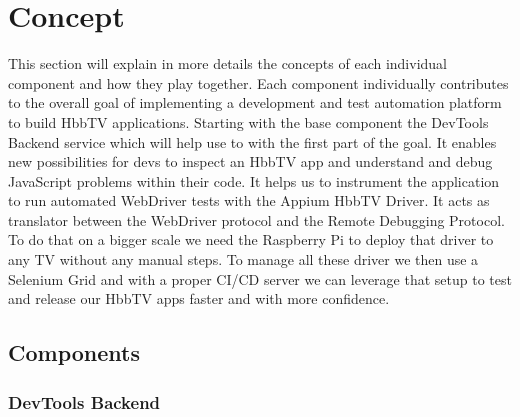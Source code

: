 %
%

\chapter{Concept\label{cha:concept}}

This section will explain in more details the concepts of each individual component and how they
play together. Each component individually contributes to the overall goal of implementing a
development and test automation platform to build HbbTV applications. Starting with the base
component the DevTools Backend service which will help use to with the first part of the goal.
It enables new possibilities for devs to inspect an HbbTV app and understand and debug JavaScript
problems within their code. It helps us to instrument the application to run automated WebDriver
tests with the Appium HbbTV Driver. It acts as translator between the WebDriver protocol
and the Remote Debugging Protocol. To do that on a bigger scale we need the Raspberry Pi to deploy
that driver to any TV without any manual steps. To manage all these driver we then use a Selenium
Grid and with a proper CI/CD server we can leverage that setup to test and release our HbbTV apps
faster and with more confidence.

\section{Components\label{sec:components}}

\subsection{DevTools Backend\label{sec:devtoolsbackend}}

